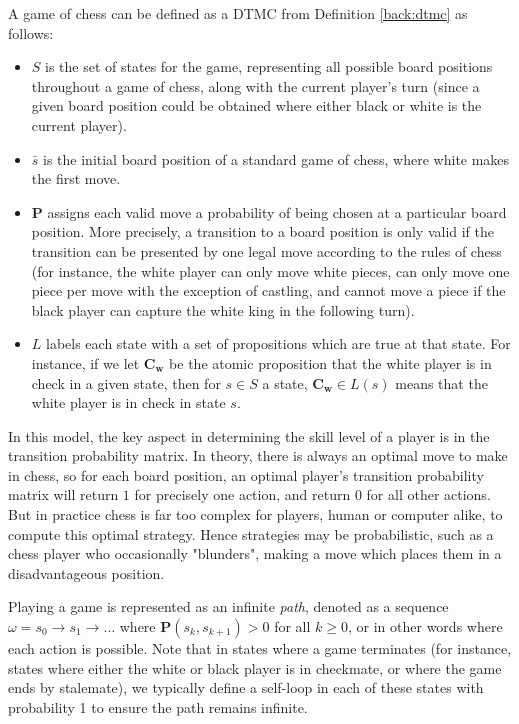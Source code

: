 \begin{example}
\label{back:chess}

    A game of chess can be defined as a DTMC from Definition \ref{back:dtmc} as follows:

    \begin{itemize}
        \item $S$ is the set of states for the game, representing all possible board positions throughout a game of chess, along with the current player's turn (since a given board position could be obtained where either black or white is the current player).
        \item $\bar{s}$ is the initial board position of a standard game of chess, where white makes the first move.
        \item $\mathbf{P}$ assigns each valid move a probability of being chosen at a particular board position. More precisely, a transition to a board position is only valid if the transition can be presented by one legal move according to the rules of chess (for instance, the white player can only move white pieces, can only move one piece per move with the exception of castling, and cannot move a piece if the black player can capture the white king in the following turn).
        \item $L$ labels each state with a set of propositions which are true at that state. For instance, if we let $\mathbf{C_w}$ be the atomic proposition that the white player is in check in a given state, then for $s \in S$ a state, $\mathbf{C_w} \in L(s)$ means that the white player is in check in state $s$.
    \end{itemize}

    In this model, the key aspect in determining the skill level of a player is in the transition probability matrix. In theory, there is always an optimal move to make in chess, so for each board position, an optimal player's transition probability matrix will return $1$ for precisely one action, and return $0$ for all other actions. But in practice chess is far too complex for players, human or computer alike, to compute this optimal strategy. Hence strategies may be probabilistic, such as a chess player who occasionally "blunders", making a move which places them in a disadvantageous position.

\end{example}

Playing a game is represented as an infinite \emph{path}, denoted as a sequence $\omega = s_0 \rightarrow s_1 \rightarrow \dots$ where $\mathbf{P}(s_k, s_{k+1})>0$ for all $k\geq0$, or in other words where each action is possible. Note that in states where a game terminates (for instance, states where either the white or black player is in checkmate, or where the game ends by stalemate), we typically define a self-loop in each of these states with probability 1 to ensure the path remains infinite.

